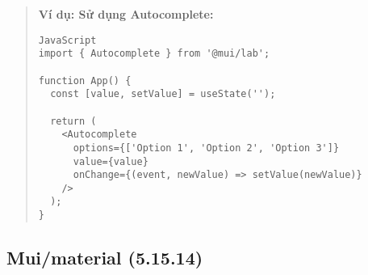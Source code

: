 \begin{quote}
\textbf{Ví dụ:  Sử dụng Autocomplete:}

\begin{lstlisting}
JavaScript
import { Autocomplete } from '@mui/lab';

function App() {
  const [value, setValue] = useState('');

  return (
    <Autocomplete
      options={['Option 1', 'Option 2', 'Option 3']}
      value={value}
      onChange={(event, newValue) => setValue(newValue)}
    />
  );
}
\end{lstlisting}

\end{quote}
\subsection{Mui/material (5.15.14)}

